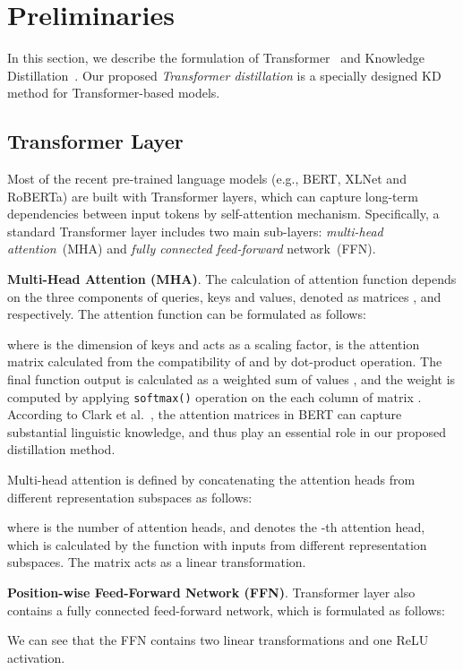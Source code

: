 \documentclass[11pt,a4paper]{article}
\begin{document}
\section{Preliminaries}\label{sec:background}
In this section, we describe the formulation of Transformer~\cite{vaswani2017attention} and Knowledge Distillation~\cite{hinton2015distilling}. Our proposed {\it Transformer distillation} is a specially designed KD method for Transformer-based models. 

\subsection{Transformer Layer}
Most of the recent pre-trained language models (e.g., BERT, XLNet and RoBERTa) are built with Transformer layers, which can capture long-term dependencies between input tokens by self-attention mechanism. Specifically, a standard Transformer layer includes two main sub-layers: {\it multi-head attention}~(MHA) and {\it fully connected feed-forward} network~(FFN).

\noindent \textbf{Multi-Head Attention (MHA)}. The calculation of attention function depends on the three components of queries, keys and values, denoted as matrices ,  and  respectively. The attention function can be formulated as follows:

where  is the dimension of keys and acts as a scaling factor,  is the attention matrix calculated from the compatibility of  and  by dot-product operation. The final function output is calculated as a weighted sum of values , and the weight is computed by applying {\tt softmax()} operation on the each column of matrix . According to Clark et al.~, the attention matrices in BERT can capture substantial linguistic knowledge, and thus play an essential role in our proposed distillation method.
 
Multi-head attention is defined by concatenating the attention heads from different representation subspaces as follows:

where  is the number of attention heads, and  denotes the -th attention head, which is calculated by the  function with inputs from different representation subspaces. The matrix  acts as a linear transformation. 


\noindent \textbf{Position-wise Feed-Forward Network (FFN)}. Transformer layer also contains a fully connected feed-forward network, which is formulated as follows:

We can see that the FFN contains two linear transformations and one ReLU activation. 
\end{document}
